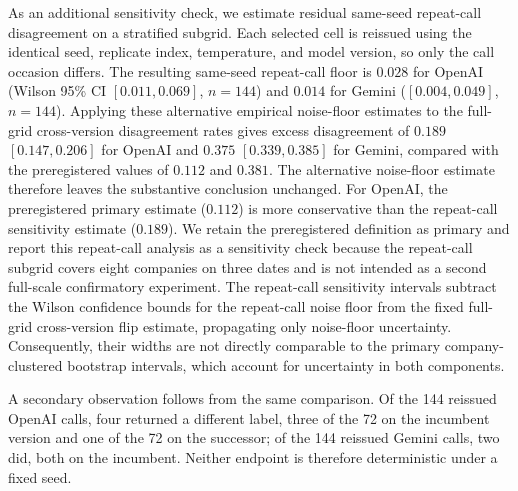 \documentclass{ieeeaccess}
\begin{document}
As an additional sensitivity check, we estimate residual same-seed repeat-call disagreement on a
stratified subgrid. Each selected cell is reissued using the identical seed, replicate index,
temperature, and model version, so only the call occasion differs. The resulting same-seed
repeat-call floor is $0.028$ for OpenAI (Wilson 95\% CI $[0.011,0.069]$, $n=144$) and $0.014$ for
Gemini ($[0.004,0.049]$, $n=144$). Applying these alternative empirical noise-floor estimates to the
full-grid cross-version disagreement rates gives excess disagreement of $0.189$ $[0.147,0.206]$ for
OpenAI and $0.375$ $[0.339,0.385]$ for Gemini, compared with the preregistered values of $0.112$ and
$0.381$. The alternative noise-floor estimate therefore leaves the substantive conclusion unchanged.
For OpenAI, the preregistered primary estimate ($0.112$) is more conservative than the
repeat-call sensitivity estimate ($0.189$).
We retain the preregistered definition as primary and report this repeat-call analysis as a
sensitivity check because the repeat-call subgrid covers eight companies on three dates and is not
intended as a second full-scale confirmatory experiment. The repeat-call sensitivity
intervals subtract the Wilson confidence bounds for the repeat-call noise floor from the
fixed full-grid cross-version flip estimate, propagating only noise-floor uncertainty.
Consequently, their widths are not directly comparable to the primary company-clustered
bootstrap intervals, which account for uncertainty in both components.

A secondary observation follows from the same comparison. Of the 144 reissued OpenAI calls, four
returned a different label, three of the 72 on the incumbent version and one of the 72 on the
successor; of the 144 reissued Gemini calls, two did, both on the incumbent. Neither endpoint is
therefore deterministic under a fixed seed.
\end{document}
